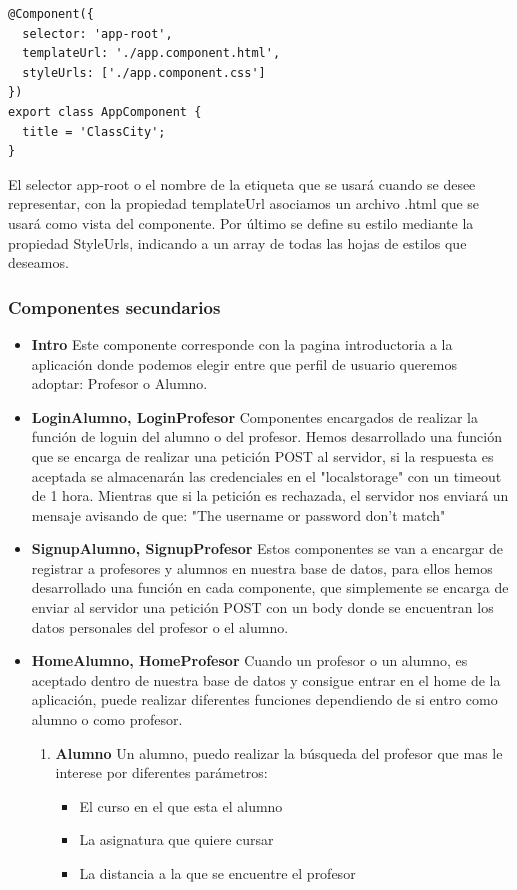 \begin{itemize}
\begin{lstlisting}
@Component({
  selector: 'app-root',
  templateUrl: './app.component.html',
  styleUrls: ['./app.component.css']
})
export class AppComponent {
  title = 'ClassCity';
}
\end{lstlisting}

El selector app-root o el nombre de la etiqueta que se usará cuando se desee representar, con la propiedad templateUrl asociamos un archivo .html que se usará como vista del componente. Por último se define su estilo mediante la propiedad StyleUrls, indicando a un array de todas las hojas de estilos que deseamos.

\subsubsection{Componentes secundarios }

\begin{itemize}
\item \textbf{Intro} Este componente corresponde con la pagina introductoria a la aplicación donde podemos elegir entre que perfil de usuario queremos adoptar: Profesor o Alumno.

\item \textbf{LoginAlumno, LoginProfesor} Componentes encargados de realizar la función de loguin del alumno o del profesor. Hemos desarrollado una función que se encarga de realizar una petición POST al servidor, si la respuesta es aceptada se almacenarán las credenciales en el "localstorage" con un timeout de 1 hora. Mientras que si la petición es rechazada, el servidor nos enviará un mensaje avisando de que: "The username or password don't match"

\item \textbf{SignupAlumno, SignupProfesor} Estos componentes se van a encargar de registrar a profesores y alumnos en nuestra base de datos, para ellos hemos desarrollado una función en cada componente, que simplemente se encarga de enviar al servidor una petición POST con un body donde se encuentran los datos personales del profesor o el alumno.

\item \textbf{HomeAlumno, HomeProfesor} Cuando un profesor o un alumno, es aceptado dentro de nuestra base de datos y consigue entrar en el home de la aplicación, puede realizar diferentes funciones dependiendo de si entro como alumno o como profesor. 

\begin{enumerate}
\item \textbf{Alumno }  Un alumno, puedo realizar la búsqueda del profesor que mas le interese por diferentes parámetros:
\begin{itemize}
    \item{El curso en el que esta el alumno}
    \item{La asignatura que quiere cursar}
    \item{La distancia a la que se encuentre el profesor}
\end{itemize}
    

\end{enumerate}
\end{itemize}
\end{itemize}
